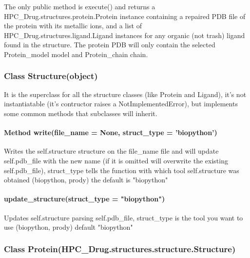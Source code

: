 		The only public method is execute() and returns a HPC\_Drug.structures.protein.Protein instance containing a repaired PDB file of the protein with its metallic ions, and a list of HPC\_Drug.structures.ligand.Ligand instances for any organic (not trash) ligand found in the structure. The protein PDB will only contain the selected Protein\_model model and Protein\_chain chain.
	
	\subsubsection{Class Structure(object)}
	
	It is the superclass for all the structure classes (like Protein and Ligand), it's not instantiatable (it's contructor raises a NotImplementedError), but implements some common methods that subclasses will inherit.
	
	\paragraph{Method write(file\_name = None, struct\_type = 'biopython')}
	
		Writes the self.structure structure on the file\_name file and will update self.pdb\_file with the new name (if it is omitted will overwrite the existing self.pdb\_file), struct\_type tells the function with which tool self.structure was obtained (biopython, prody) the default is "biopython"
	
	\paragraph{update\_structure(struct\_type = "biopython")}
	
		Updates self.structure parsing self.pdb\_file, struct\_type is the tool you want to use (biopython, prody) default "biopython" 
		
	\subsubsection{Class Protein(HPC\_Drug.structures.structure.Structure)}
	
